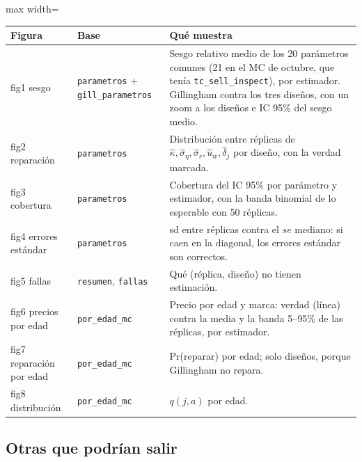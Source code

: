 \documentclass[11pt]{article}
\newcommand{\col}[1]{\texttt{#1}}
\begin{document}
\begin{center}\small
\begin{adjustbox}{max width=\textwidth}\begin{tabular}{p{3.4cm}p{3.6cm}p{7.6cm}}
\toprule
Figura & Base & Qué muestra\\
\midrule
fig1 sesgo & \texttt{parametros} + \texttt{gill\_parametros} & Sesgo relativo medio de los 20 parámetros comunes (21 en el MC de octubre, que tenía \col{tc\_sell\_inspect}), por estimador. Gillingham contra los tres diseños, con un zoom a los diseños e IC 95\% del sesgo medio.\\
fig2 reparación & \texttt{parametros} & Distribución entre réplicas de $\hat\kappa,\hat\sigma_\eta,\hat\sigma_r,\hat u_w,\hat\delta_j$ por diseño, con la verdad marcada.\\
fig3 cobertura & \texttt{parametros} & Cobertura del IC 95\% por parámetro y estimador, con la banda binomial de lo esperable con 50 réplicas.\\
fig4 errores estándar & \texttt{parametros} & sd entre réplicas contra el $se$ mediano: si caen en la diagonal, los errores estándar son correctos.\\
fig5 fallas & \texttt{resumen}, \texttt{fallas} & Qué (réplica, diseño) no tienen estimación.\\
fig6 precios por edad & \texttt{por\_edad\_mc} & Precio por edad y marca: verdad (línea) contra la media y la banda 5--95\% de las réplicas, por estimador.\\
fig7 reparación por edad & \texttt{por\_edad\_mc} & Pr(reparar) por edad; solo diseños, porque Gillingham no repara.\\
fig8 distribución & \texttt{por\_edad\_mc} & $q(j,a)$ por edad.\\
\bottomrule
\end{tabular}\end{adjustbox}
\end{center}

\subsection{Otras que podrían salir}
\end{document}
